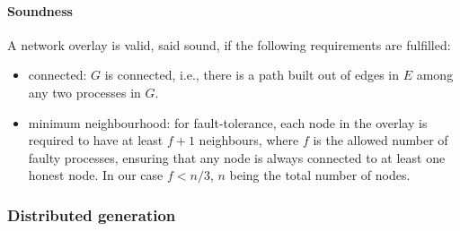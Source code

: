 \paragraph{Soundness} A network overlay is valid, said sound, if the following requirements are fulfilled:
\begin{itemize}
\item connected: $G$ is connected, i.e., there is a path
built out of edges in $E$ among any two processes in $G$.
\item minimum neighbourhood: for fault-tolerance,  each node in 
the overlay is required to have
at least $f+1$ neighbours, where $f$ is the allowed number of faulty processes,
ensuring that any node is always connected to at least one honest node.
In our case $f < n/3$, $n$ being the total number of nodes.
\end{itemize}

%



\subsubsection{Distributed generation}
\label{sec:distributedGeneration}

